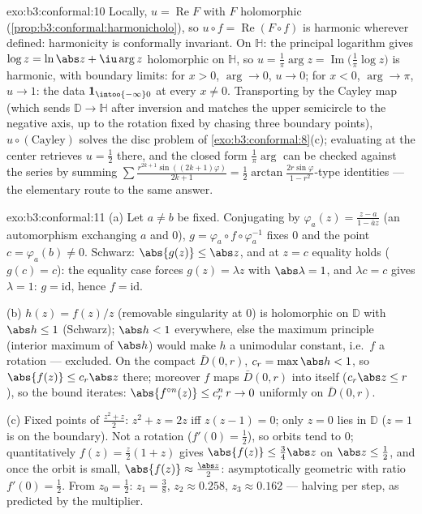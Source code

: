 \begin{solution}{exo:b3:conformal:10}
Locally, $u = \operatorname{Re}F$ with $F$ holomorphic
(\cref{prop:b3:conformal:harmonicholo}), so $u\circ f =
\operatorname{Re}(F\circ f)$ is harmonic wherever defined:
harmonicity is conformally invariant. On $\mathbb H$: the
principal logarithm gives $\log z = \ln\abs z + \iu\arg z$
holomorphic on $\mathbb H$, so $u = \frac1\pi\arg z =
\operatorname{Im}\bigl(\frac1\pi\log z\bigr)$ is harmonic,
with boundary limits: for $x > 0$, $\arg \to 0$, $u \to 0$;
for $x < 0$, $\arg \to \pi$, $u \to 1$: the data $\mathbf
1_{\intoo{-\infty}0}$ at every $x \neq 0$. Transporting by
the Cayley map (which sends $\mathbb D \to \mathbb H$ after
inversion and matches the upper semicircle to the negative
axis, up to the rotation fixed by chasing three boundary
points), $u\circ(\text{Cayley})$ solves the disc problem of
\cref{exo:b3:conformal:8}(c); evaluating at the center
retrieves $u = \frac12$ there, and the closed form
$\frac1\pi\arg$ can be checked against the series by summing
$\sum\frac{r^{2k+1}\sin((2k+1)\varphi)}{2k+1} =
\frac12\arctan\frac{2r\sin\varphi}{1 - r^2}$-type identities
--- the elementary route to the same answer.
\end{solution}

\begin{solution}{exo:b3:conformal:11}
(a) Let $a \neq b$ be fixed. Conjugating by $\varphi_a(z) =
\frac{z - a}{1 - \bar az}$ (an automorphism exchanging $a$
and $0$), $g = \varphi_a\circ f\circ\varphi_a^{-1}$ fixes
$0$ and the point $c = \varphi_a(b) \neq 0$. Schwarz:
$\abs{g(z)} \leq \abs z$, and at $z = c$ equality holds
($g(c) = c$): the equality case forces $g(z) = \lambda z$
with $\abs\lambda = 1$, and $\lambda c = c$ gives $\lambda =
1$: $g = \mathrm{id}$, hence $f = \mathrm{id}$.

(b) $h(z) = f(z)/z$ (removable singularity at $0$) is
holomorphic on $\mathbb D$ with $\abs h \leq 1$ (Schwarz);
$\abs h < 1$ everywhere, else the maximum principle
(interior maximum of $\abs h$) would make $h$ a unimodular
constant, i.e.\ $f$ a rotation --- excluded. On the compact
$\bar D(0,r)$, $c_r = \max\abs h < 1$, so $\abs{f(z)} \leq
c_r\abs z$ there; moreover $f$ maps $\bar D(0,r)$ into
itself ($c_r\abs z \leq r$), so the bound iterates:
$\abs{f^{\circ n}(z)} \leq c_r^n\,r \to 0$ uniformly on
$\bar D(0, r)$.

(c) Fixed points of $\frac{z^2 + z}2$: $z^2 + z = 2z$ iff
$z(z - 1) = 0$; only $z = 0$ lies in $\mathbb D$ ($z = 1$ is
on the boundary). Not a rotation ($f'(0) = \frac12$), so
orbits tend to $0$; quantitatively $f(z) = \frac z2(1 + z)$
gives $\abs{f(z)} \leq \frac{3}{4}\abs z$ on $\abs z \leq
\frac12$, and once the orbit is small, $\abs{f(z)} \approx
\frac{\abs z}2$: asymptotically geometric with ratio
$f'(0) = \frac12$. From $z_0 = \frac12$: $z_1 = \frac38$,
$z_2 \approx 0.258$, $z_3 \approx 0.162$ --- halving per
step, as predicted by the multiplier.
\end{solution}

